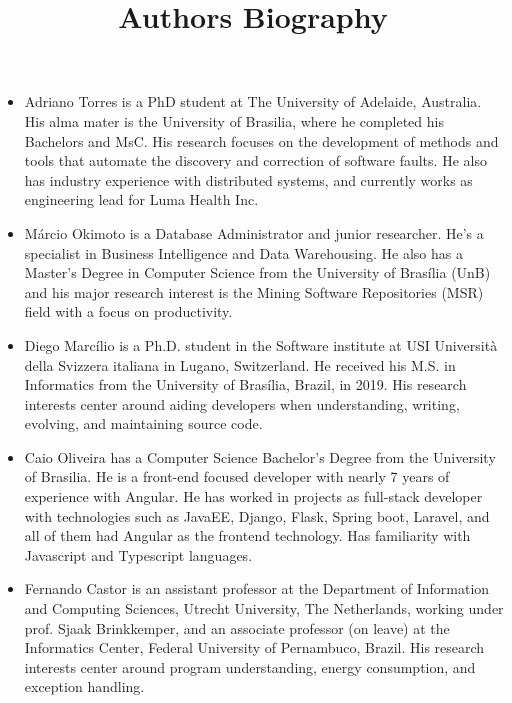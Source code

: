 \documentclass{article}
\title{Authors Biography}
\begin{document}
\maketitle

\begin{itemize}

\item Adriano Torres is a PhD student at The University of Adelaide, Australia. His alma mater is the University of Brasilia, where he completed his Bachelors and MsC. His research focuses on the development of methods and tools that automate the discovery and correction of software faults. He also has industry experience with distributed systems, and currently works as engineering lead for Luma Health Inc.

\item M\'{a}rcio Okimoto is a Database Administrator and junior researcher. He's a specialist in Business Intelligence and Data Warehousing. He also has a Master's Degree in Computer Science from the University of Brasília (UnB) and his major research interest is the Mining Software Repositories (MSR) field with a focus on productivity.

\item Diego Marc\'{i}lio is a Ph.D. student in the Software institute at USI Università della Svizzera italiana in Lugano, Switzerland.
He received his M.S. in Informatics from the University of Brasília, Brazil, in 2019. His research interests center around aiding developers when understanding, writing, evolving, and maintaining source code.  
  
\item Caio Oliveira has a Computer Science Bachelor's Degree from the University of Brasilia. He is a front-end focused developer with nearly 7
  years of experience with Angular. He has worked in projects as full-stack developer with technologies such as JavaEE, Django, Flask, Spring boot, Laravel, and all of
  them had Angular as the frontend technology. Has familiarity with Javascript and Typescript languages.

\item Fernando Castor is an assistant professor at the Department of Information and Computing Sciences, Utrecht University, The Netherlands,  working under prof. Sjaak Brinkkemper, and an associate professor (on leave) at the Informatics Center, Federal University of Pernambuco, Brazil. His research interests center around program understanding, energy consumption, and exception handling. 
  

\end{itemize}
\end{document}

